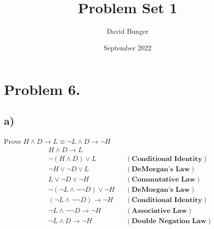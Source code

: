 \documentclass{article}
\title{Problem Set 1}
\author{David Bunger}
\date{September 2022}
\begin{document}
\maketitle

\section*{Problem 6.}
\subsection*{a)} 
Prove $H \land D \rightarrow L \equiv \lnot L \land D \rightarrow \lnot H$ \\ \hline
\begin{align*}
    & H \land D \rightarrow L \\
    & \neg (H \land D) \lor L & &(\textbf{Conditional Identity}) \\
    & \neg H \lor \neg D \lor L & &(\textbf{DeMorgan's Law}) \\
    & L \lor \neg D \lor \neg H & &(\textbf{Commutative Law}) \\
    & \neg (\neg L \land \neg \neg D) \lor \neg H & &(\textbf{DeMorgan's Law}) \\
    & (\neg L \land \neg \neg D) \rightarrow \neg H & &(\textbf{Conditional Identity}) \\
    & \neg L \land \neg \neg D \rightarrow \neg H & &(\textbf{Associative Law}) \\
    & \neg L \land D \rightarrow \neg H & &(\textbf{Double Negation Law})
\end{align*}
\clearpage
\end{document}
